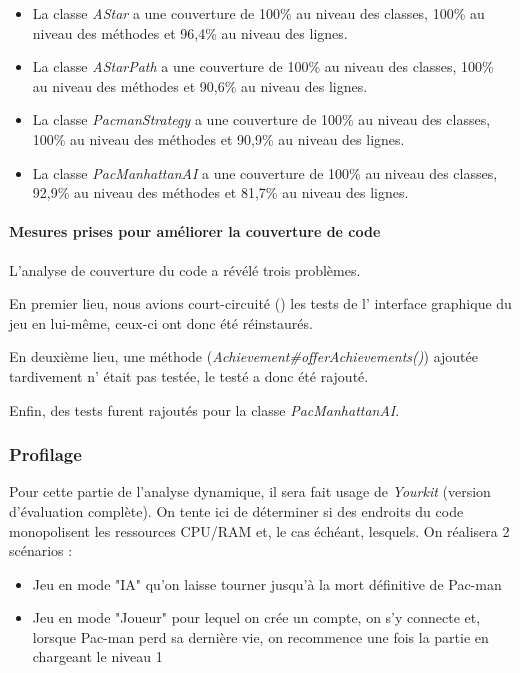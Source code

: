 \documentclass[12pt, openany]{report}
\begin{document}
\begin{itemize}
	\item La classe \mbox{\textit{AStar}} a une couverture de 100\% au niveau des classes, 100\% au niveau des méthodes et 96,4\% au niveau des lignes.
	\item La classe \mbox{\textit{AStarPath}} a une couverture de 100\% au niveau des classes, 100\% au niveau des méthodes et 90,6\% au niveau des lignes.
	\item La classe \mbox{\textit{PacmanStrategy}} a une couverture de 100\% au niveau des classes, 100\% au niveau des méthodes et 90,9\% au niveau des lignes.
	\item La classe \mbox{\textit{PacManhattanAI}} a une couverture de 100\% au niveau des classes, 92,9\% au niveau des méthodes et 81,7\% au niveau des lignes. %
\end{itemize}


\paragraph{Mesures prises pour améliorer la couverture de code}
L'analyse de couverture du code a révélé trois problèmes.

En premier lieu, nous avions \og court-circuité \fg() les tests de l' interface graphique du jeu en lui-même, ceux-ci ont donc été réinstaurés.

En deuxième lieu, une méthode (\mbox{\textit{Achievement\#offerAchievements()}}) ajoutée tardivement n' était pas testée, le testé a donc été rajouté.

Enfin, des tests furent rajoutés pour la classe \mbox{\textit{PacManhattanAI}}.

\subsubsection{Profilage}
Pour cette partie de l'analyse dynamique, il sera fait usage de \textit{Yourkit} (version d'évaluation complète). On tente ici de déterminer si des endroits du code monopolisent les ressources CPU/RAM et, le cas échéant, lesquels.
On réalisera 2 scénarios :
\begin{itemize}
	\item Jeu en mode "IA" qu'on laisse tourner jusqu'à la mort définitive de Pac-man
	\item Jeu en mode "Joueur" pour lequel on crée un compte, on s'y connecte et, lorsque Pac-man perd sa dernière vie, on recommence une fois la partie en chargeant le niveau 1
\end{itemize}
\end{document}

